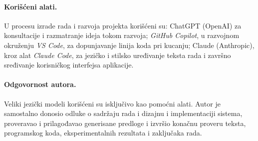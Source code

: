 \paragraph{Korišćeni alati.}
U procesu izrade rada i razvoja projekta korišćeni su:
ChatGPT (OpenAI) za konsultacije i razmatranje ideja tokom razvoja;
\emph{GitHub Copilot}, u razvojnom okruženju \emph{VS Code}, za dopunjavanje linija koda pri kucanju;
Claude (Anthropic), kroz alat \emph{Claude Code}, za jezičko i stilsko uređivanje teksta rada i završno sređivanje korisničkog interfejsa aplikacije.

\paragraph{Odgovornost autora.}
Veliki jezički modeli korišćeni su isključivo kao pomoćni alati.
Autor je samostalno donosio odluke o sadržaju rada i dizajnu i implementaciji sistema,
proveravao i prilagođavao generisane predloge
i izvršio konačnu proveru teksta, programskog koda, eksperimentalnih rezultata i zaključaka rada.
